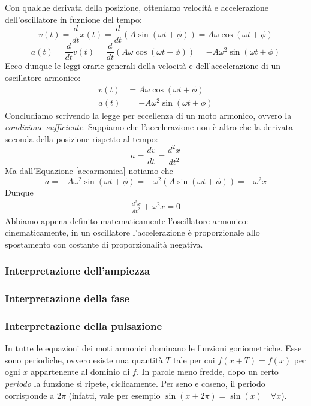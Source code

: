 Con qualche derivata della posizione, otteniamo velocità e accelerazione
dell'oscillatore in fuznione del tempo:
\[ v(t) = \frac{d}{dt}x(t) = \frac{d}{dt}(A\sin(\omega t + \phi)) = A\omega\cos(\omega t + \phi) \]
\[ a(t) = \frac{d}{dt}v(t) = \frac{d}{dt}(A\omega\cos(\omega t + \phi)) = -A\omega^2\sin(\omega t + \phi) \]
Ecco dunque le leggi orarie generali della velocità e dell'accelerazione di
un oscillatore armonico:
\begin{align}
    v(t) &= A\omega\cos(\omega t + \phi)\label{velarmonica}\\
    a(t) &= -A\omega^2\sin(\omega t + \phi)\label{accarmonica}
\end{align}
Concludiamo scrivendo la legge per eccellenza di un moto armonico, ovvero la
\textit{condizione sufficiente}. Sappiamo che l'accelerazione non è altro che
la derivata seconda della posizione rispetto al tempo:
\[ a = \frac{dv}{dt} = \frac{d^2x}{dt^2} \]
Ma dall'Equazione \ref{accarmonica} notiamo che
\[ a = -A\omega^2\sin(\omega t + \phi) = -\omega^2(A\sin(\omega t + \phi)) = -\omega^2x \]
Dunque
\begin{align}
    \frac{d^2x}{dt^2} + \omega^2x = 0
\end{align}
Abbiamo appena definito matematicamente l'oscillatore armonico: cinematicamente,
in un oscillatore l'accelerazione è proporzionale allo spostamento con costante
di proporzionalità negativa.

\subsubsection*{Interpretazione dell'ampiezza}
\subsubsection*{Interpretazione della fase}
\subsubsection{Interpretazione della pulsazione}
In tutte le equazioni dei moti armonici dominano le funzioni goniometriche.
Esse sono periodiche, ovvero esiste una quantità $T$ tale per cui $f(x + T) =
f(x)$ per ogni $x$ appartenente al dominio di $f$. In parole meno fredde,
dopo un certo \textit{periodo} la funzione si ripete, ciclicamente. Per seno
e coseno, il periodo corrisponde a $2\pi$ (infatti, vale per esempio $\sin(x+2\pi) =
\sin(x) \quad \forall x$).

